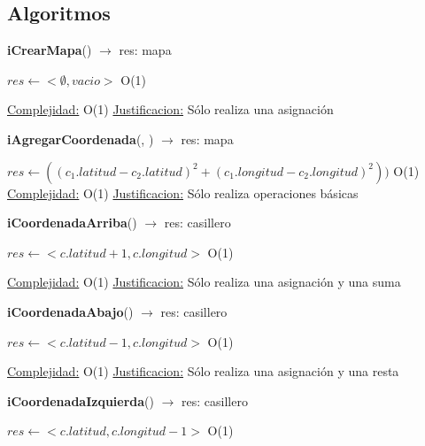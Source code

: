 \subsection{Algoritmos}
\begin{Algoritmos}

\begin{algorithm}[H]{\textbf{iCrearMapa}() $\to$ res: mapa}
	\begin{algorithmic}[1]
		\State $res \gets <\emptyset, vacio>$ \Comment O(1)
		
		\medskip
		\Statex \underline{Complejidad:} O(1)
			\Statex \underline{Justificacion:} Sólo realiza una asignación
	\end{algorithmic}
\end{algorithm}

\begin{algorithm}[H]{\textbf{iAgregarCoordenada}(, ) $\to$ res: mapa}
	\begin{algorithmic}[1]
		\State $res \gets ((c_1.latitud - c_2.latitud)^{2} + (c_1.longitud  - c_2.longitud)^{2}))$ \Comment O(1)
				\medskip
		\Statex \underline{Complejidad:} O(1)
			\Statex \underline{Justificacion:} Sólo realiza operaciones básicas
	\end{algorithmic}
\end{algorithm}

\begin{algorithm}[H]{\textbf{iCoordenadaArriba}() $\to$ res: casillero}
	\begin{algorithmic}[1]
		\State $res \gets <c.latitud +1, c.longitud>$ \Comment O(1)
		
		\medskip
		\Statex \underline{Complejidad:} O(1)
			\Statex \underline{Justificacion:} Sólo realiza una asignación y una suma
	\end{algorithmic}
\end{algorithm}

\begin{algorithm}[H]{\textbf{iCoordenadaAbajo}() $\to$ res: casillero}
	\begin{algorithmic}[1]
		\State $res \gets <c.latitud -1, c.longitud>$ \Comment O(1)
		
		\medskip
		\Statex \underline{Complejidad:} O(1)
			\Statex \underline{Justificacion:} Sólo realiza una asignación y una resta
	\end{algorithmic}
\end{algorithm}

\begin{algorithm}[H]{\textbf{iCoordenadaIzquierda}() $\to$ res: casillero}
	\begin{algorithmic}[1]
		\State $res \gets <c.latitud, c.longitud - 1>$ \Comment O(1)
		

\end{algorithmic}
\end{algorithm}
\end{Algoritmos}
